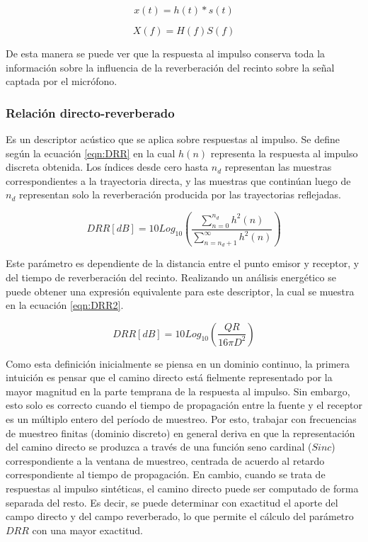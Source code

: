 \begin{equation}
\label{eqn:impulso}
	x(t) = h(t) * s(t)
\end{equation} 

\begin{equation}
\label{eqn:frecuencia}
	X(f) = H(f)S(f)
\end{equation} 

De esta manera se puede ver que la respuesta al impulso conserva toda la información sobre la influencia de la reverberación del recinto sobre la señal captada por el micrófono. 

\subsubsection{Relación directo-reverberado}

Es un descriptor acústico que se aplica sobre respuestas al impulso. Se define según la ecuación \ref{eqn:DRR} en la cual $h(n)$ representa la respuesta al impulso discreta obtenida. Los índices desde cero hasta $n_{d}$ representan las muestras correspondientes a la trayectoria directa, y las muestras que continúan luego de $n_{d}$ representan solo la reverberación producida por las trayectorias reflejadas. 

\begin{equation}
\label{eqn:DRR}
	DRR  [dB]= 10 Log_{10}(\frac{\sum_{n=0}^{n_d}h^{2}(n)}{\sum_{n=n_{d}+1}^{\infty}h^{2}(n)}) 
\end{equation}

Este parámetro es dependiente de la distancia entre el punto emisor y receptor, y del tiempo de reverberación del recinto. Realizando un análisis energético \cite{libro_dereverb} se puede obtener una expresión equivalente para este descriptor, la cual se muestra en la ecuación \ref{eqn:DRR2}.

\begin{equation}
\label{eqn:DRR2}
	DRR [dB]= 10 Log_{10}(\frac{QR}{16 \pi D^{2}}) 
\end{equation}



Como esta definición inicialmente se piensa en un dominio continuo, la primera intuición es pensar que el camino directo está fielmente representado por la mayor magnitud en la parte temprana de la respuesta al impulso. Sin embargo, esto solo es correcto cuando el tiempo de propagación entre la fuente y el receptor es un múltiplo entero del período de muestreo. Por esto, trabajar con frecuencias de muestreo finitas (dominio discreto) en general deriva en que la representación del camino directo se produzca a través de una función seno cardinal ($Sinc$) correspondiente a la ventana de muestreo, centrada de acuerdo al retardo correspondiente al tiempo de propagación. En cambio, cuando se trata de respuestas al impulso sintéticas, el camino directo puede ser computado de forma separada del resto. Es decir, se puede determinar con exactitud el aporte del campo directo y del campo reverberado, lo que permite el cálculo del parámetro $DRR$ con una mayor exactitud. 





